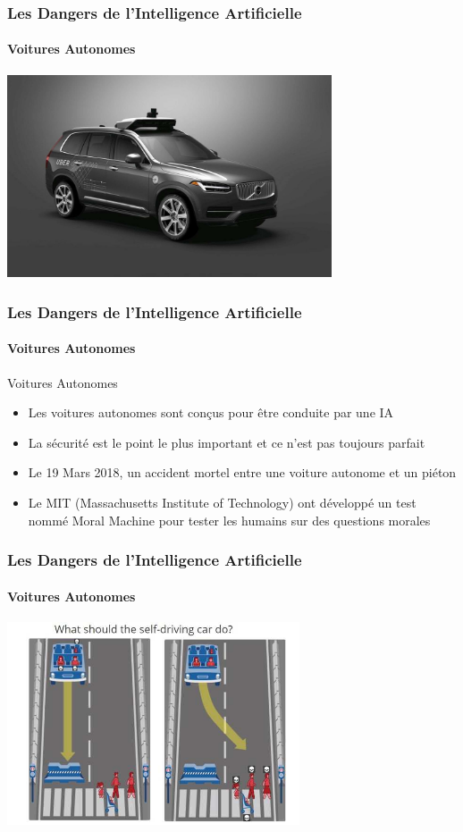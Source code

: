 \documentclass{beamer}
\begin{document}
	\begin{frame}[fragile]
	\frametitle{Les Dangers de l'Intelligence Artificielle}
	\framesubtitle{Voitures Autonomes}
	\centerline{\includegraphics[height=6cm]{uber.jpg}}
	\end{frame}
	
	\begin{frame}[fragile]
	\frametitle{Les Dangers de l'Intelligence Artificielle}
	\framesubtitle{Voitures Autonomes}
	\begin{block}{Voitures Autonomes}
	\begin{itemize}
	\itemsep1em
		\item Les voitures autonomes sont conçus pour être conduite par une IA
		\item La sécurité est le point le plus important et ce n'est pas toujours parfait
		\item Le 19 Mars 2018, un accident mortel entre une voiture autonome et un piéton
		\item Le MIT (Massachusetts Institute of Technology) ont développé un test nommé Moral Machine pour tester les humains sur des questions morales
	\end{itemize}
	\end{block}
	\end{frame}
	
	\begin{frame}[fragile]
	\frametitle{Les Dangers de l'Intelligence Artificielle}
	\framesubtitle{Voitures Autonomes}
	\centerline{\includegraphics[height=6cm]{MIT.jpg}}
	\end{frame}
	
\end{document}
